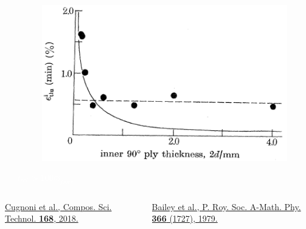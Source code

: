 \documentclass[first,firstsupp,lastsupp,last,hyperref,table]{ETHclass}
\begin{document}
\begin{frame}
\begin{columns}[c]
\begin{column}{0.5\textwidth}
\end{column}
\begin{column}{0.5\textwidth}
\centering
\begin{figure}
\centering
\includegraphics[width=\columnwidth]{bailey.png}
\end{figure}
\textcolor{white}{\tiny$t_{90^{\circ}}>100\diameter_{fiber}$}
\end{column}
\end{columns}
\vspace{0.15cm}
\begin{columns}[b]
\begin{column}{0.5\textwidth}
\centering
\pgfmathsetmacro{}
\pgfmathsetmacro{}
{\fontsize{\fontsizeref}{\stretchref} \selectfont \href{https://doi.org/10.1016/j.compscitech.2018.08.037}{Cugnoni et al., Compos. Sci. Technol. \textbf{168}, 2018.}}
\end{column}
\begin{column}{0.5\textwidth}
\centering
\pgfmathsetmacro{}
\pgfmathsetmacro{}
{\fontsize{\fontsizeref}{\stretchref} \selectfont \href{https://doi.org/10.1098/rspa.1979.0071}{Bailey et al., P. Roy. Soc. A-Math. Phy. \textbf{366} (1727), 1979.}}
\end{column}
\end{columns}
\end{frame}

\addtocounter{framenumber}{-1}
\end{document}
